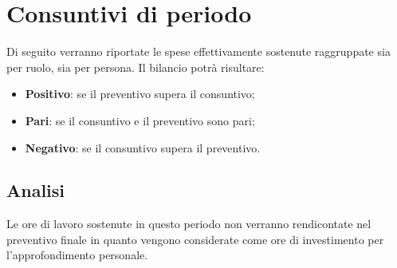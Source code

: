 \documentclass[../piano-di-progetto.tex]{subfiles}
\begin{document}
\section{Consuntivi di periodo}
Di seguito verranno riportate le spese effettivamente sostenute raggruppate sia per ruolo, sia per persona. Il bilancio potrà risultare:

\begin{itemize}
    \item \textbf{Positivo}: se il preventivo supera il consuntivo;
    \item \textbf{Pari}: se il consuntivo e il preventivo sono pari;
    \item \textbf{Negativo}: se il consuntivo supera il preventivo.
\end{itemize}

\subsection{Analisi}
Le ore di lavoro sostenute in questo periodo non verranno rendicontate nel preventivo finale in quanto vengono considerate come ore di investimento per l'approfondimento personale.
\end{document}

